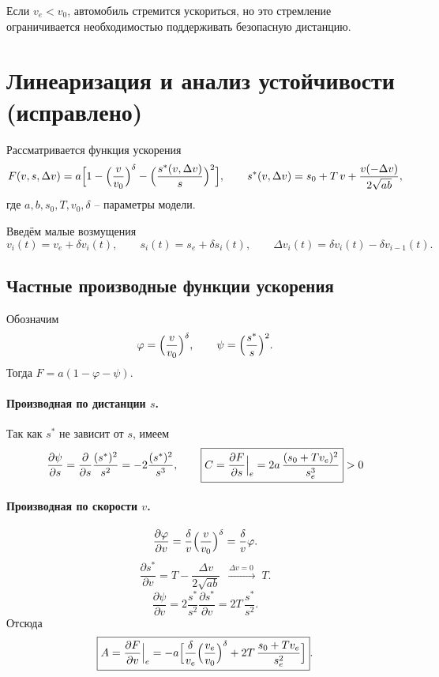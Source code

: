 Если $v_e< v_0$, автомобиль стремится ускориться, но это стремление ограничивается необходимостью поддерживать безопасную дистанцию.

\section{ Линеаризация и анализ устойчивости (исправлено)}

Рассматривается функция ускорения
\[
F(v,s,\Delta v)=
a\Bigl[1-\Bigl(\frac{v}{v_0}\Bigr)^{\delta}-\Bigl(\frac{s^\ast(v,\Delta v)}{s}\Bigr)^{2}\Bigr],
\qquad
s^\ast(v,\Delta v)=s_0+T\,v+\frac{v(-\Delta v)}{2\sqrt{ab}} ,
\]
где $a,b,s_0,T,v_0,\delta$ – параметры модели.


Введём малые возмущения
\[
v_i(t)=v_e+\delta v_i(t), \qquad 
s_i(t)=s_e+\delta s_i(t), \qquad
\Delta v_i(t)=\delta v_i(t)-\delta v_{i-1}(t).
\]

\subsection{ Частные производные функции ускорения}

Обозначим 
\[
\varphi=\Bigl(\frac{v}{v_0}\Bigr)^{\delta}, \qquad 
\psi=\Bigl(\frac{s^\ast}{s}\Bigr)^{2}.
\]
Тогда $F=a(1-\varphi-\psi)$.

\paragraph{Производная по дистанции $s$.}
Так как $s^\ast$ не зависит от $s$, имеем
\[
\frac{\partial \psi}{\partial s}=
\frac{\partial }{\partial s}\frac{(s^\ast)^2}{s^{2}}
=-2\frac{(s^\ast)^2}{s^{3}},
\qquad
\boxed{%
	C=\Bigl.\frac{\partial F}{\partial s}\Bigr|_{e}
	=2a\,\frac{(s_0+Tv_e)^2}{s_e^{3}}}>0 \]

\paragraph{Производная по скорости $v$.}
\[
\frac{\partial \varphi}{\partial v}
=\frac{\delta}{v}\Bigl(\frac{v}{v_0}\Bigr)^{\delta}
=\frac{\delta}{v}\varphi.
\]
\[
\frac{\partial s^\ast}{\partial v}=T-\frac{\Delta v}{2\sqrt{ab}}
\;\xrightarrow{\;\Delta v=0\;}\;T .
\]
\[
\frac{\partial \psi}{\partial v}
=2\frac{s^\ast}{s^{2}}\frac{\partial s^\ast}{\partial v}
=2T\,\frac{s^\ast}{s^{2}} .
\]
Отсюда
\[
\boxed{%
A=\Bigl.\frac{\partial F}{\partial v}\Bigr|_{e}
=-a\Bigl[
\frac{\delta}{v_e}\Bigl(\frac{v_e}{v_0}\Bigr)^{\delta}
+2T\,\frac{s_0+Tv_e}{s_e^{2}}
\Bigr]}.
\]


